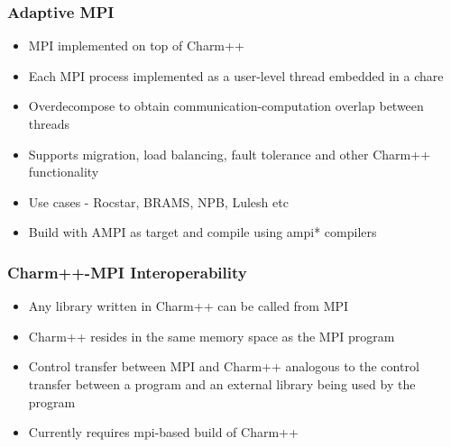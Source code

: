 \begin{frame}[fragile]

  \frametitle{Adaptive MPI}

  \begin{itemize}
    \item MPI implemented on top of Charm++ 
    \item Each MPI process implemented as a user-level thread embedded in a
    chare
    \item Overdecompose to obtain communication-computation overlap between
    threads
    \item Supports migration, load balancing, fault tolerance and other Charm++
    functionality
    \item Use cases - Rocstar, BRAMS, NPB, Lulesh etc
    \item Build with AMPI as target and compile using ampi* compilers
  \end{itemize}
\end{frame}

\begin{frame}[fragile]

  \frametitle{Charm++-MPI Interoperability}

  \begin{itemize}
    \item Any library written in Charm++ can be called from MPI
    \pause
    \item Charm++ resides in the same memory space as the MPI program
    \item Control transfer between MPI and Charm++ analogous to the control transfer
    between a program and an external library being used by the program
    \pause
    \item Currently requires mpi-based build of Charm++

  \end{itemize}
\end{frame}

